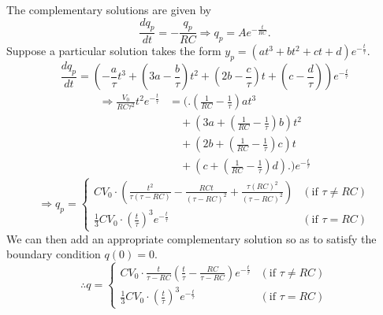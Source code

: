 \item

The complementary solutions are given by
\[
	\frac{dq_p}{dt} = -\frac{q_p}{RC}
	\Rightarrow q_p = A e^{-\frac{t}{RC}}.
\]
Suppose a particular solution takes the form $y_p = (at^3 + bt^2 + ct + d)e^{-\frac{t}{\tau}}$.
\[
	\frac{dq_p}{dt} = \left( -\frac{a}{\tau}t^3 + \left( 3a - \frac{b}{\tau} \right)t^2 + \left( 2b - \frac{c}{\tau} \right)t + \left( c - \frac{d}{\tau} \right) \right) e^{-\frac{t}{\tau}}
\]
\begin{align*}
	\Rightarrow \frac{V_0}{RC\tau^2}t^2 e^{-\frac{t}{\tau}}
	&= \Biggl(\Biggr. \left( \frac{1}{RC} - \frac{1}{\tau} \right)at^3                       \\
	&\quad + \left( 3a + \left( \frac{1}{RC} - \frac{1}{\tau} \right)b \right)t^2 \\
	&\quad + \left( 2b + \left( \frac{1}{RC} - \frac{1}{\tau} \right)c \right)t   \\
	&\quad + \left(  c + \left( \frac{1}{RC} - \frac{1}{\tau} \right)d\right)
	\Biggl.\Biggr) e^{-\frac{t}{\tau}}
\end{align*}
\[
	\Rightarrow q_p =
	\begin{cases}
		CV_0 \cdot \left(
		\frac{t^2}{\tau (\tau - RC)} - \frac{RCt}{{(\tau - RC)}^2} + \frac{\tau {(RC)}^2}{{(\tau - RC)}^2}
		\right)
		 & (\text{if } \tau \neq RC) \\
		\frac{1}{3} CV_0 \cdot {\left( \frac{t}{\tau} \right)}^3 e^{-\frac{t}{\tau}}
		 & (\text{if } \tau = RC)
	\end{cases}
\]
We can then add an appropriate complementary solution so as to satisfy the boundary condition $q(0) = 0$.
\[
	\therefore q =
	\begin{cases}
		CV_0 \cdot \frac{t}{\tau - RC} \left( \frac{t}{\tau} - \frac{RC}{\tau - RC} \right) e^{-\frac{t}{\tau}}
		 & (\text{if } \tau \neq RC) \\
		\frac{1}{3} CV_0 \cdot {\left( \frac{t}{\tau} \right)}^3 e^{-\frac{t}{\tau}}
		 & (\text{if } \tau = RC)
	\end{cases}
\]